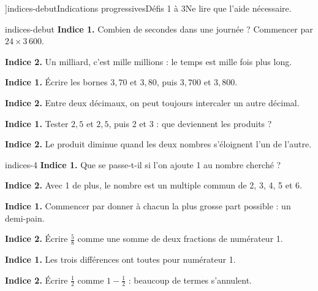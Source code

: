 \editionPage[\pdfbookmark[0]{Indications des défis}{bm-indices-debut-parent}]{indices-debut}{Indications progressives}{Défis 1 à 3}{Ne lire que l’aide nécessaire.}
\begin{blocEdition}{indices-debut}
\textbf{Indice 1.} Combien de secondes dans une journée ? Commencer par $24\times3\,600$.\par\medskip\textbf{Indice 2.} Un milliard, c’est mille millions : le temps est mille fois plus long.\par
{}\textbf{Indice 1.} Écrire les bornes $3{,}70$ et $3{,}80$, puis $3{,}700$ et $3{,}800$.\par\medskip\textbf{Indice 2.} Entre deux décimaux, on peut toujours intercaler un autre décimal.\par
{}\textbf{Indice 1.} Tester $2{,}5$ et $2{,}5$, puis 2 et 3 : que deviennent les produits ?\par\medskip\textbf{Indice 2.} Le produit diminue quand les deux nombres s’éloignent l’un de l’autre.\par

\end{blocEdition}
\begin{blocEdition}{indices-4}
\textbf{Indice 1.} Que se passe-t-il si l’on ajoute 1 au nombre cherché ?\par\medskip\textbf{Indice 2.} Avec 1 de plus, le nombre est un multiple commun de 2, 3, 4, 5 et 6.\par
{}\textbf{Indice 1.} Commencer par donner à chacun la plus grosse part possible : un demi-pain.\par\medskip\textbf{Indice 2.} Écrire $\frac58$ comme une somme de deux fractions de numérateur 1.\par
{}\textbf{Indice 1.} Les trois différences ont toutes pour numérateur 1.\par\medskip\textbf{Indice 2.} Écrire $\frac12$ comme $1-\frac12$ : beaucoup de termes s’annulent.\par

\end{blocEdition}
